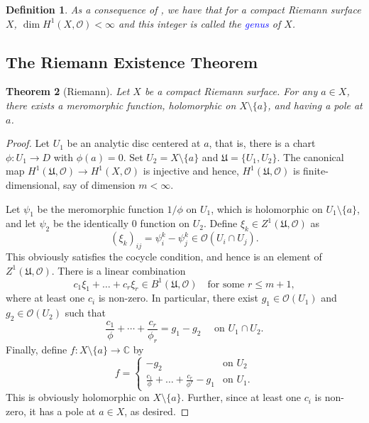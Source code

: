 \documentclass[10pt]{article}
\theoremstyle{thmstyle}
\newtheorem{theorem}{Theorem}[section]
\theoremstyle{defstyle}
\newtheorem{definition}[theorem]{Definition}
\newcommand{\bbC}{\mathbb{C}}
\newcommand{\frakU}{\mathfrak{U}}
\newcommand{\scrO}{\mathscr{O}} %
\newcommand{\define}[1]{\textcolor{blue}{\textit{#1}}}
\renewcommand{\le}{\leqslant}
\begin{document}
\begin{definition}
    As a consequence of , we have that for a compact Riemann surface $X$, $\dim H^1(X,\scrO) < \infty$ and this integer is called the \define{genus} of $X$.
\end{definition}

\subsection{The Riemann Existence Theorem}

\begin{theorem}[Riemann]
    Let $X$ be a compact Riemann surface. For any $a\in X$, there exists a meromorphic function, holomorphic on $X\setminus\{a\}$, and having a pole at $a$.
\end{theorem}
\begin{proof}
    Let $U_1$ be an analytic disc centered at $a$, that is, there is a chart $\phi: U_1\to D$ with $\phi(a) = 0$. Set $U_2 = X\setminus\{a\}$ and $\frakU = \{U_1, U_2\}$. The canonical map $H^1(\frakU,\scrO)\to H^1(X,\scrO)$ is injective and hence, $H^1(\frakU,\scrO)$ is finite-dimensional, say of dimension $m < \infty$.

    Let $\psi_1$ be the meromorphic function $1/\phi$ on $U_1$, which is holomorphic on $U_1\setminus\{a\}$, and let $\psi_2$ be the identically $0$ function on $U_2$. Define $\xi_k\in Z^1(\frakU,\scrO)$ as 
    \begin{equation*}
        (\xi_k)_{ij} = \psi_i^k - \psi_j^k\in\scrO(U_i\cap U_j).
    \end{equation*}
    This obviously satisfies the cocycle condition, and hence is an element of $Z^1(\frakU,\scrO)$. There is a linear combination 
    \begin{equation*}
        c_1\xi_1 + \dots + c_r\xi_r\in B^1(\frakU,\scrO)\quad\text{for some } r\le m + 1,
    \end{equation*}
    where at least one $c_i$ is non-zero. In particular, there exist $g_1\in\scrO(U_1)$ and $g_2\in\scrO(U_2)$ such that 
    \begin{equation*}
        \frac{c_1}{\phi} + \cdots + \frac{c_r}{\phi_r} = g_1 - g_2\quad\text{ on } U_1\cap U_2.
    \end{equation*}
    Finally, define $f: X\setminus\{a\}\to\bbC$ by 
    \begin{equation*}
        f = 
        \begin{cases}
            -g_2 & \text{on } U_2\\
            \frac{c_1}{\phi} + \dots + \frac{c_r}{\phi^r} - g_1 & \text{on } U_1.
        \end{cases}
    \end{equation*}
    This is obviously holomorphic on $X\setminus\{a\}$. Further, since at least one $c_i$ is non-zero, it has a pole at $a\in X$, as desired.
\end{proof}
\end{document}
